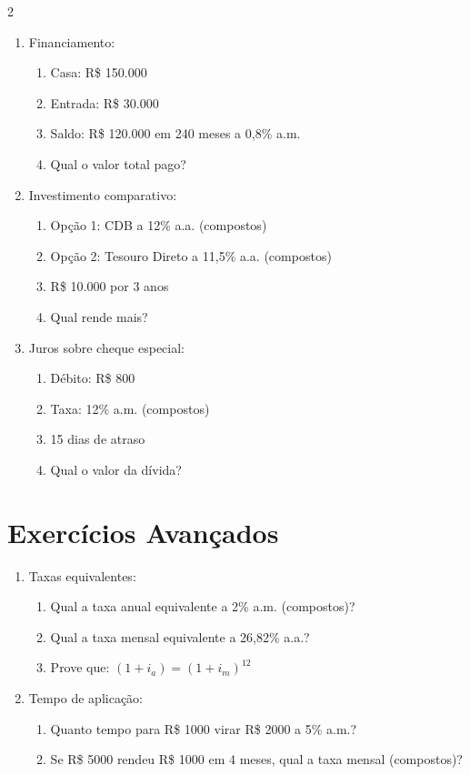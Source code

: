 \documentclass[11pt]{article}
\begin{document}
\begin{multicols}{2}
\begin{enumerate}[leftmargin=*, start=11]
\item Financiamento:
\begin{enumerate}[label=\alph*)]
\item Casa: R\$ 150.000
\item Entrada: R\$ 30.000
\item Saldo: R\$ 120.000 em 240 meses a 0,8\% a.m.
\item Qual o valor total pago?
\end{enumerate}

\item Investimento comparativo:
\begin{enumerate}[label=\alph*)]
\item Opção 1: CDB a 12\% a.a. (compostos)
\item Opção 2: Tesouro Direto a 11,5\% a.a. (compostos)
\item R\$ 10.000 por 3 anos
\item Qual rende mais?
\end{enumerate}

\item Juros sobre cheque especial:
\begin{enumerate}[label=\alph*)]
\item Débito: R\$ 800
\item Taxa: 12\% a.m. (compostos)
\item 15 dias de atraso
\item Qual o valor da dívida?
\end{enumerate}

\end{enumerate}

\section*{Exercícios Avançados}

\begin{enumerate}[leftmargin=*, start=16]

\item Taxas equivalentes:
\begin{enumerate}[label=\alph*)]
\item Qual a taxa anual equivalente a 2\% a.m. (compostos)?
\item Qual a taxa mensal equivalente a 26,82\% a.a.?
\item Prove que: $(1 + i_a) = (1 + i_m)^{12}$
\end{enumerate}

\item Tempo de aplicação:
\begin{enumerate}[label=\alph*)]
\item Quanto tempo para R\$ 1000 virar R\$ 2000 a 5\% a.m.?
\item Se R\$ 5000 rendeu R\$ 1000 em 4 meses, qual a taxa mensal (compostos)?
\end{enumerate}


\end{enumerate}
\end{multicols}
\end{document}
